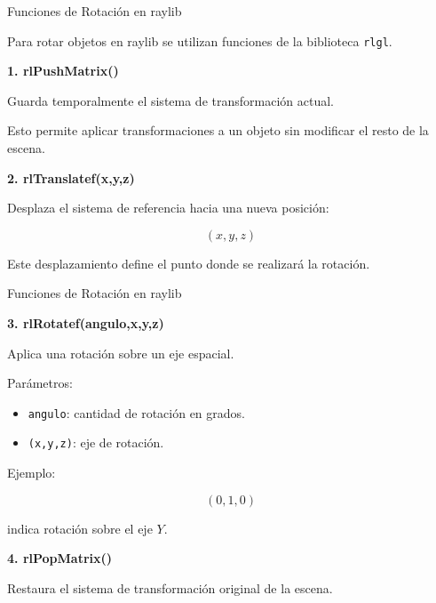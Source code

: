 \documentclass{beamer}
\begin{document}
\begin{frame}{Funciones de Rotación en raylib}

Para rotar objetos en raylib se utilizan funciones de la biblioteca \texttt{rlgl}.

\vspace{0.5cm}

\textbf{1. rlPushMatrix()}

\vspace{0.2cm}

Guarda temporalmente el sistema de transformación actual.

\vspace{0.3cm}

Esto permite aplicar transformaciones a un objeto sin modificar el resto de la escena.

\vspace{0.5cm}

\textbf{2. rlTranslatef(x,y,z)}

\vspace{0.2cm}

Desplaza el sistema de referencia hacia una nueva posición:

$$
(x,y,z)
$$

\vspace{0.2cm}

Este desplazamiento define el punto donde se realizará la rotación.

\end{frame}



\begin{frame}{Funciones de Rotación en raylib}

\textbf{3. rlRotatef(angulo,x,y,z)}

\vspace{0.2cm}

Aplica una rotación sobre un eje espacial.

\vspace{0.3cm}

Parámetros:

\begin{itemize}
    \item \texttt{angulo}: cantidad de rotación en grados.
    \item \texttt{(x,y,z)}: eje de rotación.
\end{itemize}

\vspace{0.4cm}

Ejemplo:

$$
(0,1,0)
$$

indica rotación sobre el eje \(Y\).

\vspace{0.5cm}

\textbf{4. rlPopMatrix()}

\vspace{0.2cm}

Restaura el sistema de transformación original de la escena.

\end{frame}
\end{document}
